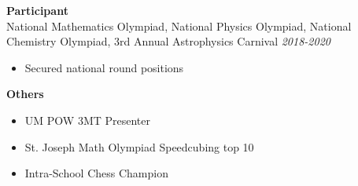 \documentclass[10pt,a4paper]{article}
\newenvironment{project}{
    \begin{itemize}[leftmargin=3ex, rightmargin=2ex, noitemsep, labelsep=1.2mm, itemsep=0mm, topsep=0mm]\small
}{
    \end{itemize}
}
\begin{document}
\textbf{Participant} \\
National Mathematics Olympiad, National Physics Olympiad, National Chemistry Olympiad, 3rd Annual Astrophysics Carnival \hfill \textit{2018-2020}
\begin{project}
    \item Secured national round positions
\end{project}
\vspace{2mm}

\textbf{Others}
\begin{project}
    \item UM POW 3MT Presenter
    \item St. Joseph Math Olympiad Speedcubing top 10
    \item Intra-School Chess Champion
\end{project}
\vspace{2mm}
\end{document}
